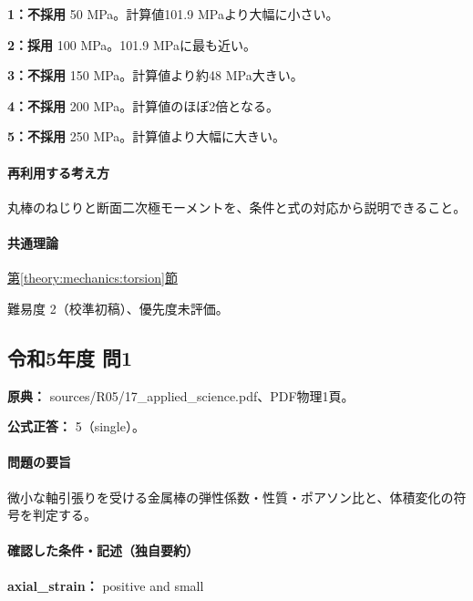 \noindent\textbf{1：不採用} 50 MPa。計算値101.9 MPaより大幅に小さい。\par

\noindent\textbf{2：採用} 100 MPa。101.9 MPaに最も近い。\par

\noindent\textbf{3：不採用} 150 MPa。計算値より約48 MPa大きい。\par

\noindent\textbf{4：不採用} 200 MPa。計算値のほぼ2倍となる。\par

\noindent\textbf{5：不採用} 250 MPa。計算値より大幅に大きい。\par

\paragraph{再利用する考え方} 丸棒のねじりと断面二次極モーメントを、条件と式の対応から説明できること。

\paragraph{共通理論} \hyperref[theory:mechanics:torsion]{第\ref*{theory:mechanics:torsion}節}

\par 難易度 2（校準初稿）、優先度未評価。

\subsection{令和5年度 問1}
\label{q:r05-reg-applied-01}

\noindent\textbf{原典：} sources/R05/17\_applied\_science.pdf、PDF物理1頁。

\textbf{公式正答：} 5（single）。

\paragraph{問題の要旨} 微小な軸引張りを受ける金属棒の弾性係数・性質・ポアソン比と、体積変化の符号を判定する。

\paragraph{確認した条件・記述（独自要約）}\mbox{}\par

\noindent\textbf{axial\_strain：} positive and small\par

